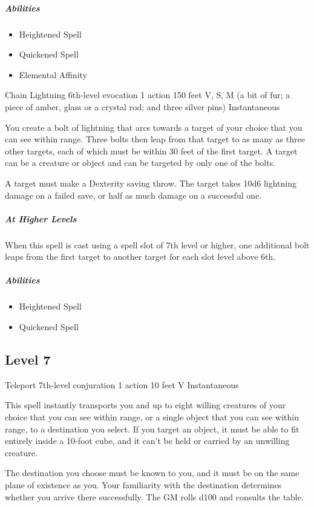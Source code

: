 \documentclass[a4paper,openany,twocolumn]{book}
\begin{document}
\subparagraph*{Abilities}
\begin{itemize}
  \item Heightened Spell
  \item Quickened Spell
  \item Elemental Affinity
\end{itemize}

\DndSpellHeader
  {Chain Lightning}
  {6th-level evocation}
  {1 action}
  {150 feet}
  {V, S, M (a bit of fur; a piece of amber, glass or a crystal rod; and three silver pins)}
  {Instantaneous}

You create a bolt of lightning that arcs towards a target of your choice that you can see within range. Three bolts then leap from that target to as many as three other targets, each of which must be within 30 feet of the first target. A target can be a creature or object and can be targeted by only one of the bolts.

A target must make a Dexterity saving throw. The target takes 10d6 lightning damage on a failed save, or half as much damage on a successful one.

\subparagraph*{At Higher Levels} When this spell is cast using a spell slot of 7th level or higher, one additional bolt leaps from the first target to another target for each slot level above 6th.

\subparagraph*{Abilities}
\begin{itemize}
  \item Heightened Spell
  \item Quickened Spell
\end{itemize}

\subsection*{Level 7}

\DndSpellHeader
  {Teleport}
  {7th-level conjuration}
  {1 action}
  {10 feet}
  {V}
  {Instantaneous}

This spell instantly transports you and up to eight willing creatures of your choice that you can see within range, or a single object that you can see within range, to a destination you select. If you target an object, it must be able to fit entirely inside a 10-foot cube, and it can’t be held or carried by an unwilling creature.

The destination you choose must be known to you, and it must be on the same plane of existence as you. Your familiarity with the destination determines whether you arrive there successfully. The GM rolls d100 and consults the table.
\end{document}
